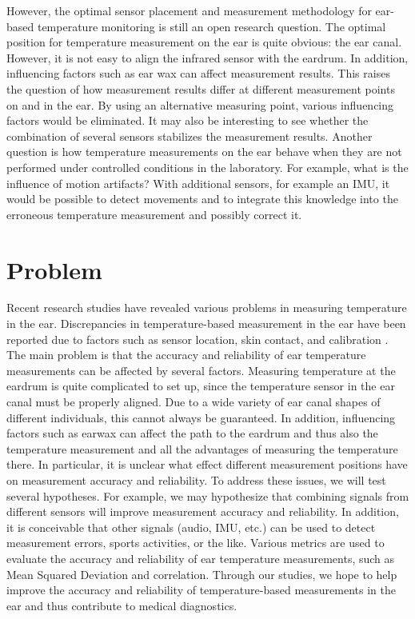 However, the optimal sensor placement and measurement methodology for ear-based temperature monitoring is still an open research question. 
The optimal position for temperature measurement on the ear is quite obvious: the ear canal. 
However, it is not easy to align the infrared sensor with the eardrum. In addition, influencing factors such as ear wax can affect measurement results. 
This raises the question of how measurement results differ at different measurement points on and in the ear. 
By using an alternative measuring point, various influencing factors would be eliminated.
It may also be interesting to see whether the combination of several sensors stabilizes the measurement results.
Another question is how temperature measurements on the ear behave when they are not performed under controlled conditions in the laboratory.
For example, what is the influence of motion artifacts?
With additional sensors, for example an IMU, it would be possible to detect movements and to integrate this knowledge into the erroneous temperature measurement and possibly correct it.

\section{Problem}
Recent research studies have revealed various problems in measuring temperature in the ear.
Discrepancies in temperature-based measurement in the ear have been reported due to factors such as sensor location, skin contact, and calibration \cite{rohrbergTemperatureMeasurementEar1997, gasimAccuracyTympanicTemperature2013, amoateng-adjepongAccuracyInfraredTympanic1999a, hookerScreeningFeverAdult1996a, cattaneoAccuracyPrecisionBody2000}.
The main problem is that the accuracy and reliability of ear temperature measurements can be affected by several factors. 
Measuring temperature at the eardrum is quite complicated to set up, since the temperature sensor in the ear canal must be properly aligned. 
Due to a wide variety of ear canal shapes of different individuals, this cannot always be guaranteed.
In addition, influencing factors such as earwax can affect the path to the eardrum and thus also the temperature measurement and all the advantages of measuring the temperature there.
In particular, it is unclear what effect different measurement positions have on measurement accuracy and reliability.
To address these issues, we will test several hypotheses. 
For example, we may hypothesize that combining signals from different sensors will improve measurement accuracy and reliability.
In addition, it is conceivable that other signals (audio, IMU, etc.) can be used to detect measurement errors, sports activities, or the like.
Various metrics are used to evaluate the accuracy and reliability of ear temperature measurements, such as Mean Squared Deviation and correlation.
Through our studies, we hope to help improve the accuracy and reliability of temperature-based measurements in the ear and thus contribute to medical diagnostics.

